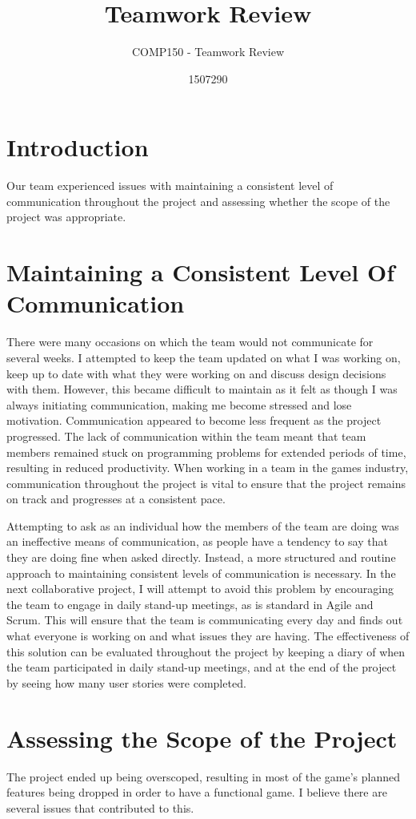 \documentclass{scrartcl}
\title{Teamwork Review}
\subtitle{COMP150 - Teamwork Review}
\author{1507290}
\begin{document}
\maketitle

\abstract{}

\section{Introduction}
Our team experienced issues with maintaining a consistent level of communication throughout the project and assessing whether the scope of the project was appropriate.

\section{Maintaining a Consistent Level Of Communication}
There were many occasions on which the team would not communicate for several weeks. I attempted to keep the team updated on what I was working on, keep up to date with what they were working on and discuss design decisions with them. However, this became difficult to maintain as it felt as though I was always initiating communication, making me become stressed and lose motivation. Communication appeared to become less frequent as the project progressed. The lack of communication within the team meant that team members remained stuck on programming problems for extended periods of time, resulting in reduced productivity. When working in a team in the games industry, communication throughout the project is vital to ensure that the project remains on track and progresses at a consistent pace.

Attempting to ask as an individual how the members of the team are doing was an ineffective means of communication, as people have a tendency to say that they are doing fine when asked directly. Instead, a more structured and routine approach to maintaining consistent levels of communication is necessary. In the next collaborative project, I will attempt to avoid this problem by encouraging the team to engage in daily stand-up meetings, as is standard in Agile and Scrum. This will ensure that the team is communicating every day and finds out what everyone is working on and what issues they are having. The effectiveness of this solution can be evaluated throughout the project by keeping a diary of when the team participated in daily stand-up meetings, and at the end of the project by seeing how many user stories were completed.

\section{Assessing the Scope of the Project}
The project ended up being overscoped, resulting in most of the game's planned features being dropped in order to have a functional game. I believe there are several issues that contributed to this. 
\end{document}
